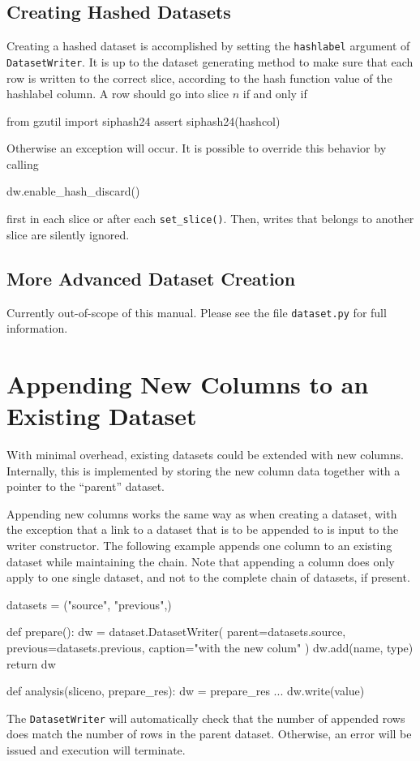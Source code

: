\subsection{Creating Hashed Datasets}
Creating a hashed dataset is accomplished by setting
the \texttt{hashlabel} argument of \texttt{DatasetWriter}.  It is up
to the dataset generating method to make sure that each row is written
to the correct slice, according to the hash function value of the
hashlabel column.  A row should go into slice $n$ if and only if
\begin{python}
from gzutil import siphash24
assert siphash24(hashcol) %
\end{python}
Otherwise an exception will occur.  It is possible to override this
behavior by calling
\begin{python}
dw.enable_hash_discard()
\end{python}
first in each slice or after each \texttt{set\_slice()}.  Then, writes
that belongs to another slice are silently ignored.



\subsection{More Advanced Dataset Creation}
Currently out-of-scope of this manual.  Please see the file
\texttt{dataset.py} for full information.


\clearpage
\section{Appending New Columns to an Existing Dataset}

With minimal overhead, existing datasets could be extended with new
columns.  Internally, this is implemented by storing the new column
data together with a pointer to the ``parent'' dataset.

Appending new columns works the same way as when creating a dataset,
with the exception that a link to a dataset that is to be appended to
is input to the writer constructor.  The following example appends one
column to an existing dataset while maintaining the chain.  Note that
appending a column does only apply to one single dataset, and not to
the complete chain of datasets, if present.
\begin{python}
datasets = ("source", "previous",)

def prepare():
    dw = dataset.DatasetWriter(
        parent=datasets.source,
        previous=datasets.previous,
        caption="with the new colum"
    )
    dw.add(name, type)
    return dw

def analysis(sliceno, prepare_res):
    dw = prepare_res
    ...
    dw.write(value)
\end{python}
The \texttt{DatasetWriter} will automatically check that the number of
appended rows does match the number of rows in the parent dataset.
Otherwise, an error will be issued and execution will terminate.
